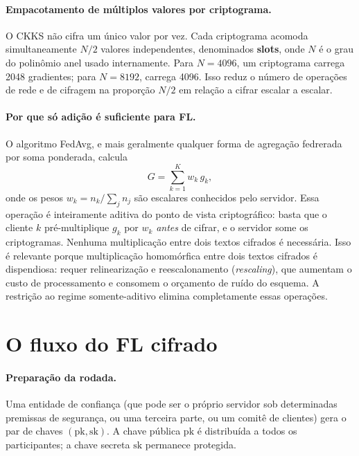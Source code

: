 \documentclass[11pt,a4paper]{article}
\begin{document}
\paragraph{Empacotamento de múltiplos valores por criptograma.}
O CKKS não cifra um único valor por vez. Cada criptograma acomoda simultaneamente
$N/2$ valores independentes, denominados \textbf{slots}, onde $N$ é o grau do
polinômio anel usado internamente. Para $N=4096$, um criptograma carrega 2048 gradientes;
para $N=8192$, carrega 4096. Isso reduz o número de operações de rede e de cifragem
na proporção $N/2$ em relação a cifrar escalar a escalar.

\paragraph{Por que só adição é suficiente para FL.}
O algoritmo FedAvg, e mais geralmente qualquer forma de agregação fedrerada por soma
ponderada, calcula
\[
  G = \sum_{k=1}^{K} w_k\, g_k,
\]
onde os pesos $w_k = n_k / \sum_j n_j$ são escalares conhecidos pelo servidor. Essa
operação é inteiramente aditiva do ponto de vista criptográfico: basta que o cliente
$k$ pré-multiplique $g_k$ por $w_k$ \emph{antes} de cifrar, e o servidor some os
criptogramas. Nenhuma multiplicação entre dois textos cifrados é necessária. Isso é
relevante porque multiplicação homomórfica entre dois textos cifrados é dispendiosa:
requer relinearização e reescalonamento (\emph{rescaling}), que aumentam o custo de
processamento e consomem o orçamento de ruído do esquema. A restrição ao regime
somente-aditivo elimina completamente essas operações.

\section{O fluxo do FL cifrado}
\label{sec:fluxo}

\paragraph{Preparação da rodada.}
Uma entidade de confiança (que pode ser o próprio servidor sob determinadas
premissas de segurança, ou uma terceira parte, ou um comitê de clientes) gera o par
de chaves $(\text{pk}, \text{sk})$. A chave pública $\text{pk}$ é distribuída a todos
os participantes; a chave secreta $\text{sk}$ permanece protegida.
\end{document}
